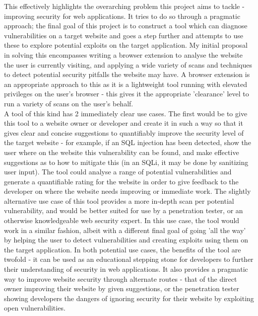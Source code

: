 This effectively highlights the overarching problem this project aims to tackle - improving security for web applications. It tries to do so through a pragmatic approach; the final goal of this project is to construct a tool which can diagnose vulnerabilities on a target website and goes a step further and attempts to use these to explore potential exploits on the target application.  
My initial proposal in solving this encompasses writing a browser extension to analyse the website the user is currently visiting, and applying a wide variety of scans and techniques to detect potential security pitfalls the website may have.
A browser extension is an appropriate approach to this as it is a lightweight tool running with elevated privileges on the user's browser - this gives it the appropriate 'clearance' level to run a variety of scans on the user's behalf. \\


A tool of this kind has 2 immediately clear use cases. 
The first would be to give this tool to a website owner or developer and create it in such a way so that it gives clear and concise suggestions to quantifiably improve the security level of the target website - for example, if an SQL injection has been detected, show the user where on the website this vulnerability can be found, and make effective suggestions as to how to mitigate this (in an SQLi, it may be done by sanitizing user input). The tool could analyse a range of potential vulnerabilities and generate a quantifiable rating for the website in order to give feedback to the developer on where the website needs improving or immediate work.
The slightly alternative use case of this tool provides a more in-depth scan per potential vulnerability, and would be better suited for use by a penetration tester, or an otherwise knowledgeable web security expert. In this use case, the tool would work in a similar fashion, albeit with a different final goal of going 'all the way' by helping the user to detect vulnerabilities and creating exploits using them on the target application. 
In both potential use cases, the benefits of the tool are twofold - it can be used as an educational stepping stone for developers to further their understanding of security in web applications. It also provides a pragmatic way to improve website security through alternate routes - that of the direct owner improving their website by given suggestions, or the penetration tester showing developers the dangers of ignoring security for their website by exploiting open vulnerabilities. \\

